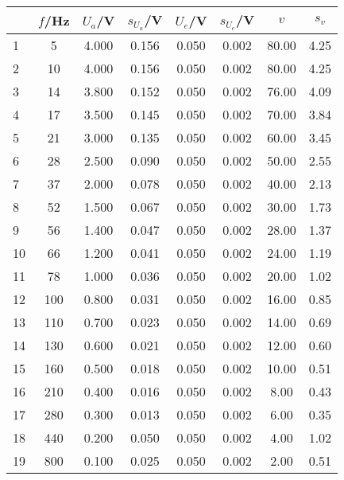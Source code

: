 \begin{center}
    \begin{tabular}{l | c c c c c | c c}
        {} &   $f$/Hz &  $U_a$/V &  $s_{U_a}$/V &  $U_e$/V &  $s_{U_e}$/V 
        &      $v$ &   $s_v$ \\
        \hline
        1  &      5 &  4.000 &      0.156 &   0.050 &      0.002 &  80.00 &  4.25 \\
        2  &     10 &  4.000 &      0.156 &   0.050 &      0.002 &  80.00 &  4.25 \\
        3  &     14 &  3.800 &      0.152 &   0.050 &      0.002 &  76.00 &  4.09 \\
        4  &     17 &  3.500 &      0.145 &   0.050 &      0.002 &  70.00 &  3.84 \\
        5  &     21 &  3.000 &      0.135 &   0.050 &      0.002 &  60.00 &  3.45 \\
        6  &     28 &  2.500 &      0.090 &   0.050 &      0.002 &  50.00 &  2.55 \\
        7  &     37 &  2.000 &      0.078 &   0.050 &      0.002 &  40.00 &  2.13 \\
        8  &     52 &  1.500 &      0.067 &   0.050 &      0.002 &  30.00 &  1.73 \\
        9  &     56 &  1.400 &      0.047 &   0.050 &      0.002 &  28.00 &  1.37 \\
        10 &     66 &  1.200 &      0.041 &   0.050 &      0.002 &  24.00 &  1.19 \\
        11 &     78 &  1.000 &      0.036 &   0.050 &      0.002 &  20.00 &  1.02 \\
        12 &    100 &  0.800 &      0.031 &   0.050 &      0.002 &  16.00 &  0.85 \\
        13 &    110 &  0.700 &      0.023 &   0.050 &      0.002 &  14.00 &  0.69 \\
        14 &    130 &  0.600 &      0.021 &   0.050 &      0.002 &  12.00 &  0.60 \\
        15 &    160 &  0.500 &      0.018 &   0.050 &      0.002 &  10.00 &  0.51 \\
        16 &    210 &  0.400 &      0.016 &   0.050 &      0.002 &   8.00 &  0.43 \\
        17 &    280 &  0.300 &      0.013 &   0.050 &      0.002 &   6.00 &  0.35 \\
        18 &    440 &  0.200 &      0.050 &   0.050 &      0.002 &   4.00 &  1.02 \\
        19 &    800 &  0.100 &      0.025 &   0.050 &      0.002 &   2.00 &  0.51 \\

\end{tabular}
\end{center}
